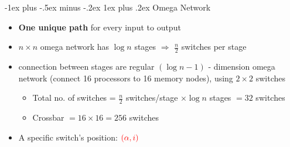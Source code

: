 \documentclass[10pt,landscape]{article}
\makeatletter
\newcommand{\subsubsubsection}{\@startsection{subsubsection}{3}{0mm}%
                                {-1ex plus -.5ex minus -.2ex}%
                                {1ex plus .2ex}%
                                {\normalfont\scriptsize\bfseries}}
\makeatother
\begin{document}
\begin{multicols*}{3}
\subsubsubsection{Omega Network}
\begin{itemize}[topsep=0pt,noitemsep,wide=0pt, leftmargin=\dimexpr{} + 2\relax]
    \item \textbf{One unique path} for every input to output
    \item $n \times n$ omega network has $\log n$ stages $\Rightarrow$ $\frac{n}{2}$ switches per stage
    \item connection between stages are regular $(\log n - 1)$ - dimension omega network (connect 16 processors to 16 memory nodes), using $2\times 2$ switches
    \begin{itemize}[topsep=0pt,noitemsep,wide=0pt, leftmargin=\dimexpr{} + 2\relax]
        \item Total no. of switches = $\frac{n}{2}$ switches/stage $\times \log n$ stages $= 32$ switches
        \item Crossbar $= 16 \times 16 = 256$ switches
    \end{itemize}
    \item A specific switch’s position: $\textcolor{red}{(\alpha, i)}$


\end{itemize}
\end{multicols*}
\end{document}
